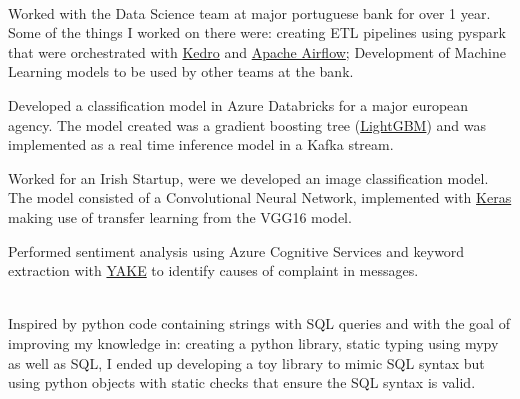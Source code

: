 \documentclass[a4paper]{MagicalCV}
\begin{document}
\begin{minipage}[t]{0.66\textwidth}
 \\
\vspace{\topsep} %
\begin{tightemize}
    \item Worked with the Data Science team at major portuguese bank for over 1 year. Some of the things I worked on there were: creating ETL pipelines using pyspark that were orchestrated with \href{https://kedro.readthedocs.io/en/stable/index.html}{Kedro} and \href{https://airflow.apache.org}{Apache Airflow}; Development of Machine Learning models to be used by other teams at the bank.
    \item Developed a classification model in Azure Databricks for a major european agency. The model created was a gradient boosting tree (\href{https://lightgbm.readthedocs.io/en/latest/}{LightGBM}) and was implemented as a real time inference model in a Kafka stream.
    \item Worked for an Irish Startup, were we developed an image classification model. The model consisted of a Convolutional Neural Network, implemented with \href{https://keras.io/}{Keras} making use of transfer learning from the VGG16 model.
    \item Performed sentiment analysis using Azure Cognitive Services and keyword extraction with \href{http://yake.inesctec.pt/}{YAKE} to identify causes of complaint in messages.
\end{tightemize}
\sectionsep


 \\
 Inspired by python code containing strings with SQL queries and with the goal of improving my knowledge in: creating a python library, static typing using mypy as well as SQL, I ended up developing a toy library to mimic SQL syntax but using python objects with static checks that ensure the SQL syntax is valid.
\sectionsep

\end{minipage} 

\printbibliography
\end{document}
